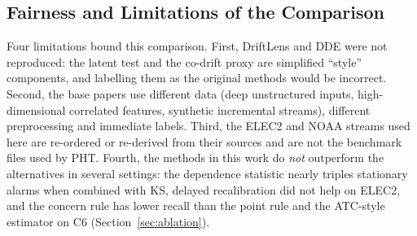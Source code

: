 \subsection{Fairness and Limitations of the Comparison}
Four limitations bound this comparison. First, DriftLens and DDE were not reproduced:
the latent test and the co-drift proxy are simplified ``style'' components, and
labelling them as the original methods would be incorrect. Second, the base papers
use different data (deep unstructured inputs, high-dimensional correlated features,
synthetic incremental streams), different preprocessing and immediate labels.
Third, the ELEC2 and NOAA streams used here are re-ordered or re-derived from their
sources and are not the benchmark files used by PHT. Fourth, the methods in this work
do \emph{not} outperform the alternatives in several settings: the dependence statistic
nearly triples stationary alarms when combined with KS, delayed recalibration did not help on ELEC2, and the
concern rule has lower recall than the point rule and the ATC-style estimator on C6
(Section~\ref{sec:ablation}).
